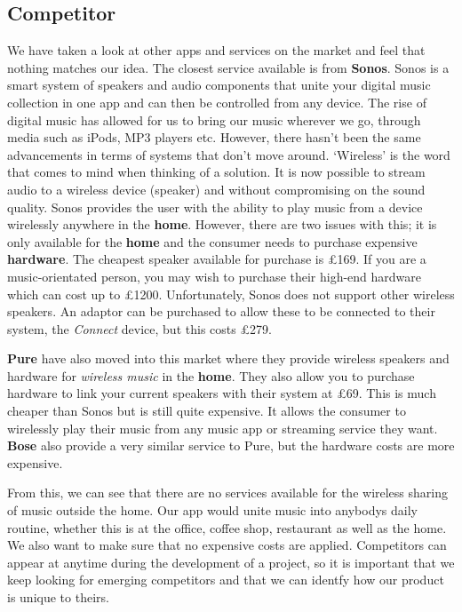 \subsection{\textbf{Competitor}}
    We have taken a look at other apps and services on the market and feel that nothing matches our idea. The closest service available is from \textbf{Sonos}. Sonos is a smart system of speakers and audio components that unite your digital music collection in one app and can then be controlled from any device. The rise of digital music has allowed for us to bring our music wherever we go, through media such as iPods, MP3 players etc. However, there hasn't been the same advancements in terms of systems that don't move around. `Wireless' is the word that comes to mind when thinking of a solution. It is now possible to stream audio to a wireless device (speaker) and without compromising on the sound quality. Sonos provides the user with the ability to play music from a device wirelessly anywhere in the \textbf{home}. However, there are two issues with this; it is only available for the \textbf{home} and the consumer needs to purchase expensive \textbf{hardware}. The cheapest speaker available for purchase is \pounds169. If you are a music-orientated person, you may wish to purchase their high-end hardware which can cost up to \pounds1200. Unfortunately, Sonos does not support other wireless speakers. An adaptor can be purchased to allow these to be connected to their system, the \emph{Connect} device, but this costs \pounds279.  

    \textbf{Pure} have also moved into this market where they provide wireless speakers and hardware for \emph{wireless music} in the \textbf{home}. They also allow you to purchase hardware to link your current speakers with their system at \pounds69.  This is much cheaper than Sonos but is still quite expensive. It allows the consumer to wirelessly play their music from any music app or streaming service they want. \textbf{Bose} also provide a very similar service to Pure, but the hardware costs are more expensive.

    From this, we can see that there are no services available for the wireless sharing of music outside the home. Our app would unite music into anybodys daily routine, whether this is at the office, coffee shop, restaurant as well as the home. We also want to make sure that no expensive costs are applied.
    Competitors can appear at anytime during the development of a project, so it is important that we keep looking for emerging competitors and that we can identfy how our product is unique to theirs. 

